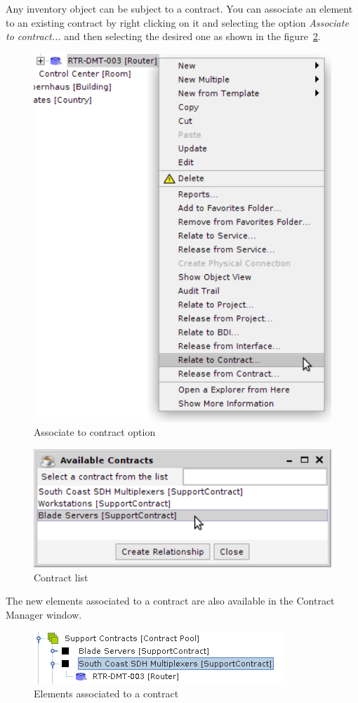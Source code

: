 \documentclass[a4paper]{article}
\begin{document}
		Any inventory object can be subject to a contract. You can associate an element to an existing contract by right clicking on it and selecting the option \textit{Associate to contract...} and then selecting the desired one as shown in the figure~\ref{fig:contract_manager_contract_list}.
		\begin{figure}[h!]
			\centering
			\includegraphics[width=0.4\linewidth]{img/contract_manager_associate_option.png}
			\caption{Associate to contract option}
			\label{fig:contract_manager_associate_option}
		\end{figure}		
		\newline
		\begin{figure}[h!]
			\centering
			\includegraphics[width=0.4\linewidth]{img/contract_manager_contract_list.png}
			\caption{Contract list}
			\label{fig:contract_manager_contract_list}
		\end{figure}
		
		The new elements associated to a contract are also available in the Contract Manager window.
		\begin{figure}[h!]
			\centering
			\includegraphics[width=0.4\linewidth]{img/contract_manager_elements.png}
			\caption{Elements associated to a contract}
			\label{fig:contract_manager_elements}
		\end{figure}
		
\end{document}
